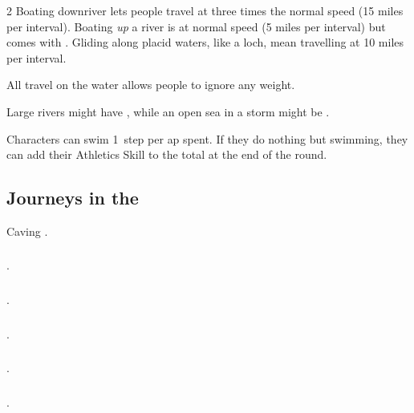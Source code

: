 \begin{multicols}{2}
Boating downriver lets people travel at three times the normal speed (15 miles per \gls{interval}).
Boating \emph{up} a river is at normal speed (5 miles per \gls{interval}) but comes with .
Gliding along placid waters, like a loch, mean travelling at 10 miles per \gls{interval}.

All travel on the water allows people to ignore any \gls{weight}.

Large rivers might have \tn[8], while an open sea in a storm might be \tn[12].

Characters can swim 1~\gls{step} per \gls{ap} spent.
If they do nothing but swimming, they can add their Athletics Skill to the total at the end of the round.

\subsection{Journeys in the }
Caving .

\subsubsection{}
.

\subsubsection{}
.

\subsubsection{}
.

\subsubsection{}
.

\subsubsection{}
.


\end{multicols}
